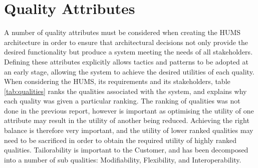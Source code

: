 \documentclass[10pt,a4paper]{article}
\begin{document}
\section{Quality Attributes}
\label{sec:qualities}
A number of quality attributes must be considered when creating the HUMS architecture in order to ensure that architectural decisions not only provide the desired functionality but produce a system meeting the needs of all stakeholders.
Defining these attributes explicitly allows tactics and patterns to be adopted at an early stage, allowing the system to achieve the desired utilities of each quality. 
When considering the HUMS, its requirements and its stakeholders, table \ref{tab:qualities} ranks the qualities associated with the system, and explains why each quality was given a particular ranking. The ranking of qualities was not done in the previous report, however is important as optimising the utility of one attribute may result in the utility of another being reduced. Achieving the right balance is therefore very important, and the utility of lower ranked qualities may need to be sacrificed in order to obtain the required utility of highly ranked qualities. Tailorability is important to the Customer, and has been decomposed into a number of sub qualities: Modifiability, Flexibility, and Interoperability.
\end{document}
